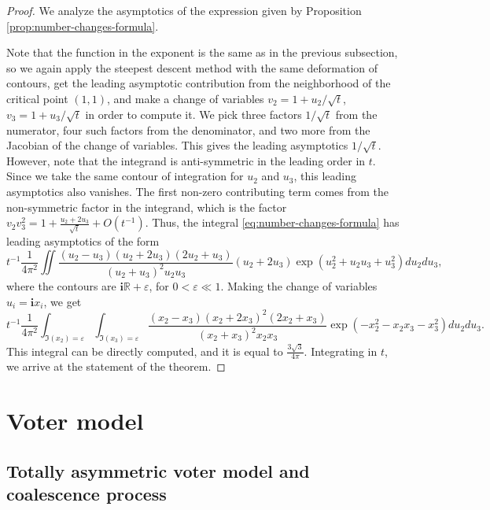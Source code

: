 \documentclass[11pt,reqno]{amsart}
\theoremstyle{definition}
\theoremstyle{remark}
\theoremstyle{remark}
\newcommand{\ii}{{\mathbf i}}
\numberwithin{equation}{section}
\begin{document}
	\begin{proof}
		
		We analyze the asymptotics of the expression given by Proposition \ref{prop:number-changes-formula}. 
		
		Note that the function in the exponent is the same as in the previous subsection, so we again apply the steepest descent method with the same deformation of contours, get the leading asymptotic contribution from the neighborhood of  the critical point $(1,1)$, and make a change of variables $v_2 = 1+ u_2 / \sqrt{t}$, $v_3 = 1+ u_3 / \sqrt{t}$ in order to compute it. We pick three factors $1 / \sqrt{t}$ from the numerator, four such factors from the denominator, and two more from the Jacobian of the change of variables. This gives the leading asymptotics $1/\sqrt{t}$. However, note that the integrand is anti-symmetric in the leading order in $t$. Since we take the same contour of integration for $u_2$ and $u_3$, this leading asymptotics also vanishes. The first non-zero contributing term comes from the non-symmetric factor in the integrand, which is the factor $v_2 v_3^2 = 1 + \frac{u_2+2 u_3}{\sqrt{t}}+O(t^{-1})$. Thus, the integral \eqref{eq:number-changes-formula} has leading asymptotics of the form
		$$
		t^{-1} \frac{1}{4 \pi^2} \iint \frac{(u_2-u_3)(u_2+2u_3)(2u_2+u_3)}{(u_2+u_3)^2 u_2 u_3} (u_2+2 u_3) \exp \left( u_2^2 + u_2 u_3 +u_3^2 \right) du_2 du_3,
		$$
		where the contours are $\ii \mathbb{R} + \varepsilon$, for $0<\varepsilon \ll 1$. Making the change of variables $u_i = \ii x_i$, we get
		$$
		t^{-1} \frac{1}{4 \pi^2} \int_{\Im (x_2)= \varepsilon} \int_{\Im (x_3)= \varepsilon} \frac{(x_2-x_3)(x_2+2x_3)^2 (2x_2+x_3)}{(x_2+x_3)^2 x_2 x_3} \exp \left( -x_2^2 - x_2 x_3 - x_3^2 \right) du_2 du_3.
		$$
		This integral can be directly computed, and it is equal to $\frac{3 \sqrt{3}}{4 \pi}$. Integrating in $t$, we arrive at the statement of the theorem.  
		
	\end{proof}
	
	\section{Voter model}
	\label{sec:Voter-section}
	
	\subsection{Totally asymmetric voter model and coalescence process}
	\label{sec:voter-1}
	
\end{document}
